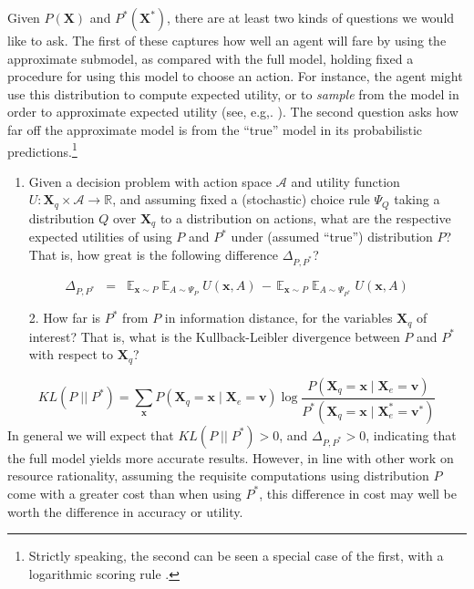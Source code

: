 \documentclass[10pt,letterpaper]{article}
\begin{document}
Given $P(\textbf{X})$ and $P^*(\textbf{X}^*)$, there are at least two kinds of questions we would like to ask. The first of these captures how well an agent will fare by using the approximate submodel, as compared with the full model, holding fixed a procedure for using this model to choose an action. For instance, the agent might use this distribution to compute expected utility, or to \emph{sample} from the model in order to approximate expected utility (see, e.g,. \citealt{Vul2014}). The second question asks how far off the approximate model is from the ``true'' model in its probabilistic predictions.\footnote{Strictly speaking, the second can be seen a special case of the first, with a logarithmic scoring rule \citep{Bernardo}.} \begin{enumerate}
  \item Given a decision problem with action space $\mathcal{A}$ and utility function $U:\textbf{X}_q\times \mathcal{A} \rightarrow\mathbb{R}$, and assuming fixed a (stochastic) choice rule $\Psi_Q$ taking a distribution $Q$ over $\textbf{X}_q$ to a distribution on actions, what are the respective expected utilities of using $P$ and $P^*$ under (assumed ``true'') distribution $P$? That is, how great is the following difference $\Delta_{P,P^*}$? \end{enumerate}
  $$\Delta_{P,P^*} \;\; = \;\; \mathbb{E}_{\textbf{x}\sim P}\;\mathbb{E}_{A \sim \Psi_{P}}\;U(\textbf{x},A) \,-\, \mathbb{E}_{\textbf{x} \sim P}\;\mathbb{E}_{A \sim \Psi_{P^*}}\;U(\textbf{x},A)$$
  \begin{enumerate}
  \item[2.] How far is $P^*$ from $P$ in information distance, for the variables $\textbf{X}_q$ of interest? That is, what is the Kullback-Leibler divergence between $P$ and $P^*$ with respect to $\textbf{X}_q$?
\end{enumerate}$$KL(P \;||\; P^*)  =  \sum_{\textbf{x}} P(\textbf{X}_q = \textbf{x} \mid \textbf{X}_{e} = \textbf{v})\; \mbox{log} \; \frac{P(\textbf{X}_q = \textbf{x} \mid \textbf{X}_{e} = \textbf{v})}{P^*(\textbf{X}_q = \textbf{x} \mid \textbf{X}^*_{e} = \textbf{v}^*)}$$
In general we will expect that $KL(P \;||\; P^*) > 0$, and 
$\Delta_{P,P^*}>0$, indicating that the full model yields more accurate results. However, in line with other work on resource rationality, assuming the requisite computations using distribution $P$ come with a greater cost than when using $P^*$, this difference in cost may well be worth the difference in accuracy or utility.
\end{document}
